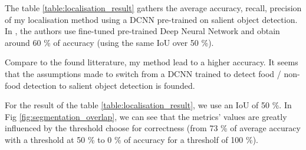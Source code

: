 The table \ref{table:localisation_result} gathers the average accuracy, recall, precision of my localisation method using a DCNN pre-trained on salient object detection. In \cite{Bolanos2016}, the authors use fine-tuned pre-trained Deep Neural Network and obtain around 60 \% of accuracy (using the same IoU over 50 \%).

Compare to the found litterature, my method lead to a higher accuracy. It seems that the assumptions made to switch from a DCNN trained to detect food / non-food detection to salient object detection is founded.

For the result of the table \ref{table:localisation_result}, we use an IoU of 50 \%. In Fig \ref{fig:segmentation_overlap}, we can see that the metrics' values are greatly influenced by the threshold choose for correctness (from 73 \% of average accuracy with a threshold at 50 \% to 0 \% of accuracy for a thresholf of 100 \%).

